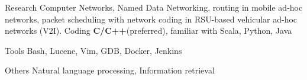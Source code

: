 
\begin{cvskills}

  \cvskill
    {Research} %
    {Computer Networks, Named Data Networking, routing in mobile ad-hoc networks, packet scheduling with network coding in RSU-based vehicular ad-hoc networks (V2I).} %
  \cvskill
    {Coding} %
    {\textbf{C/C++}(preferred), familiar with Scala, Python, Java} %

 \cvskill
   {Tools} %
   {Bash, Lucene, Vim, GDB, Docker, Jenkins} %

 \cvskill
   {Others} %
   {Natural language processing, Information retrieval} %

\end{cvskills}
